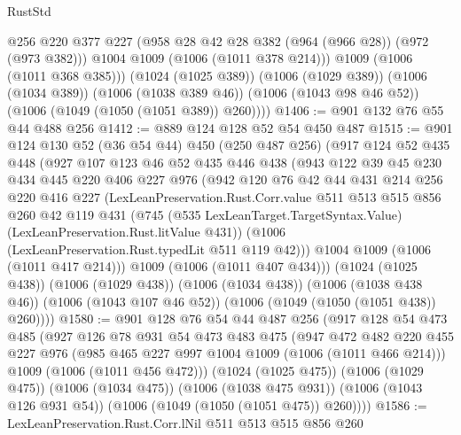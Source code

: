 \begin{lexlean}{RustStd}
\begin{coremodule}
            @256
            @220
            @377
            @227
            (@958 @28 @42 @28 @382 (@964 (@966 @28)) (@972 (@973 @382)))
            @1004
            @1009
            (@1006 (@1011 @378 @214)))
          @1009
          (@1006 (@1011 @368 @385)))
        (@1024 (@1025 @389))
        (@1006 (@1029 @389))
        (@1006 (@1034 @389))
        (@1006 (@1038 @389 @46))
        (@1006 (@1043 @98 @46 @52))
        (@1006 (@1049 (@1050 (@1051 @389)) @260))))
@1406 := @901 @132 @76 @55 @44 @488 @256
@1412 := @889 @124 @128 @52 @54 @450 @487
@1515 := @901
    @124
    @130
    @52
    (@36 @54 @44)
    @450
    (@250 @487 @256)
    (@917
      @124
      @52
      @435
      @448
      (@927
        @107
        @123
        @46
        @52
        @435
        @446
        @438
        (@943
          @122
          @39
          @45
          @230
          @434
          @445
          @220
          @406
          @227
          @976
          (@942
            @120
            @76
            @42
            @44
            @431
            @214
            @256
            @220
            @416
            @227
            (LexLeanPreservation.Rust.Corr.value
              @511
              @513
              @515
              @856
              @260
              @42
              @119
              @431
              (@745
                (@535 LexLeanTarget.TargetSyntax.Value)
                (LexLeanPreservation.Rust.litValue @431))
              (@1006 (LexLeanPreservation.Rust.typedLit @511 @119 @42)))
            @1004
            @1009
            (@1006 (@1011 @417 @214)))
          @1009
          (@1006 (@1011 @407 @434)))
        (@1024 (@1025 @438))
        (@1006 (@1029 @438))
        (@1006 (@1034 @438))
        (@1006 (@1038 @438 @46))
        (@1006 (@1043 @107 @46 @52))
        (@1006 (@1049 (@1050 (@1051 @438)) @260))))
@1580 := @901
    @128
    @76
    @54
    @44
    @487
    @256
    (@917
      @128
      @54
      @473
      @485
      (@927
        @126
        @78
        @931
        @54
        @473
        @483
        @475
        (@947
          @472
          @482
          @220
          @455
          @227
          @976
          (@985 @465 @227 @997 @1004 @1009 (@1006 (@1011 @466 @214)))
          @1009
          (@1006 (@1011 @456 @472)))
        (@1024 (@1025 @475))
        (@1006 (@1029 @475))
        (@1006 (@1034 @475))
        (@1006 (@1038 @475 @931))
        (@1006 (@1043 @126 @931 @54))
        (@1006 (@1049 (@1050 (@1051 @475)) @260))))
@1586 := LexLeanPreservation.Rust.Corr.lNil @511 @513 @515 @856 @260

\end{coremodule}
\end{lexlean}

